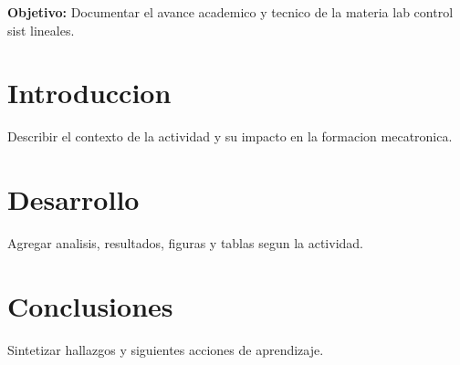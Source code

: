 \documentclass[spanish,letterpaper,oneside]{article}
\begin{document}
\templatePortrait
\templatePagecfg
\onehalfspacing

\begin{abstractd}
\textbf{Objetivo:} Documentar el avance academico y tecnico de la materia lab control sist lineales.
\end{abstractd}

\templateIndex
\templateFinalcfg

\section{Introduccion}
Describir el contexto de la actividad y su impacto en la formacion mecatronica.

\section{Desarrollo}
Agregar analisis, resultados, figuras y tablas segun la actividad.

\section{Conclusiones}
Sintetizar hallazgos y siguientes acciones de aprendizaje.



\end{document}
